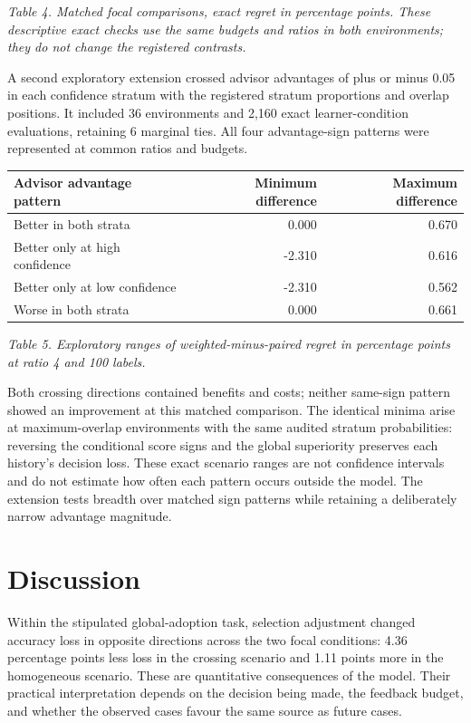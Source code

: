 \documentclass[
  british,
  11pt,
]{article}
\newcounter{none} %
\begin{document}
\emph{Table 4. Matched focal comparisons, exact regret in percentage
points. These descriptive exact checks use the same budgets and ratios
in both environments; they do not change the registered contrasts.}

A second exploratory extension crossed advisor advantages of plus or
minus 0.05 in each confidence stratum with the registered stratum
proportions and overlap positions. It included 36 environments and 2,160
exact learner-condition evaluations, retaining 6 marginal ties. All four
advantage-sign patterns were represented at common ratios and budgets.


{\def\LTcaptype{none} %
\begin{longtable}[]{@{}lrr@{}}
\toprule\noalign{}
Advisor advantage pattern & Minimum difference & Maximum difference \\
\midrule\noalign{}
\endhead
\bottomrule\noalign{}
\endlastfoot
Better in both strata & 0.000 & 0.670 \\
Better only at high confidence & -2.310 & 0.616 \\
Better only at low confidence & -2.310 & 0.562 \\
Worse in both strata & 0.000 & 0.661 \\
\end{longtable}
}

\emph{Table 5. Exploratory ranges of weighted-minus-paired regret in
percentage points at ratio 4 and 100 labels.}

Both crossing directions contained benefits and costs; neither same-sign
pattern showed an improvement at this matched comparison. The identical
minima arise at maximum-overlap environments with the same audited
stratum probabilities: reversing the conditional score signs and the
global superiority preserves each history's decision loss. These exact
scenario ranges are not confidence intervals and do not estimate how
often each pattern occurs outside the model. The extension tests breadth
over matched sign patterns while retaining a deliberately narrow
advantage magnitude.

\section{Discussion}\label{discussion}

Within the stipulated global-adoption task, selection adjustment changed
accuracy loss in opposite directions across the two focal conditions:
4.36 percentage points less loss in the crossing scenario and 1.11
points more in the homogeneous scenario. These are quantitative
consequences of the model. Their practical interpretation depends on the
decision being made, the feedback budget, and whether the observed cases
favour the same source as future cases.
\end{document}
